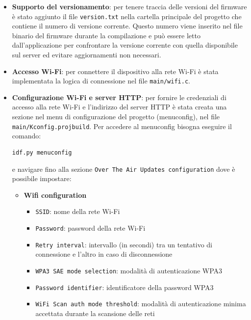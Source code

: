 \documentclass[a4paper]{article}
\begin{document}
\begin{itemize}
  \item \textbf{Supporto del versionamento}: per tenere traccia delle versioni del firmware
    è stato aggiunto il file \texttt{version.txt} nella cartella principale del progetto
    che contiene il numero di versione corrente. Questo numero viene inserito nel
    file binario del firmware durante la compilazione e può essere letto dall'applicazione
    per confrontare la versione corrente con quella disponibile sul server ed evitare
    aggiornamenti non necessari.

  \item \textbf{Accesso Wi-Fi}: per connettere il dispositivo alla rete Wi-Fi è stata
    implementata la logica di connessione nel file \texttt{main/wifi.c}.

  \item \textbf{Configurazione Wi-Fi e server HTTP}: per fornire le credenziali di
    accesso alla rete Wi-Fi e l'indirizzo del server HTTP è stata creata una sezione
    nel menu di configurazione del progetto (menuconfig), nel file
    \texttt{main/Kconfig.projbuild}. Per accedere al menuconfig bisogna eseguire
    il comando:
\begin{lstlisting}
idf.py menuconfig
\end{lstlisting}
    e navigare fino alla sezione \texttt{Over The Air Updates configuration} dove è
    possibile impostare:
    \begin{itemize}
      \item \textbf{Wifi configuration}
        \begin{itemize}
          \item \texttt{SSID}: nome della rete Wi-Fi
          \item \texttt{Password}: password della rete Wi-Fi
          \item \texttt{Retry interval}: intervallo (in secondi) tra un tentativo di
            connessione e l'altro in caso di disconnessione
          \item \texttt{WPA3 SAE mode selection}: modalità di autenticazione WPA3
          \item \texttt{Password identifier}: identificatore della password WPA3
          \item \texttt{WiFi Scan auth mode threshold}: modalità di
            autenticazione minima accettata durante la scansione delle reti
        \end{itemize}


\end{itemize}
\end{itemize}
\end{document}
